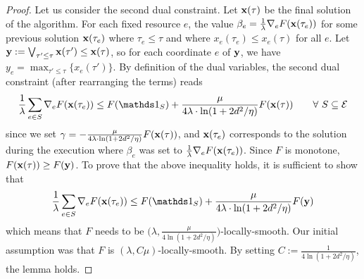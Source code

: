 \begin{proof}
Let us consider the second dual constraint. Let $\mathbf{x}(\tau)$ be the final solution of the algorithm. For each fixed resource $e$, the value $\beta_{e} = \frac{1}{\lambda} \nabla_{e} F(\mathbf{x}(\tau_e))$ for some previous solution $\mathbf{x}(\tau_e)$ where $\tau_e \le \tau$ and where $x_{e}(\tau_e) \leq x_{e}(\tau)$ for all $e$.
Let $\mathbf{y} := \bigvee_{\tau' \le \tau} \mathbf{x}(\tau') \leq \mathbf{x}(\tau)$, so for each coordinate $e$ of $\mathbf{y}$, we have $y_{e} = \max_{\tau' \le \tau}\{x_{e}(\tau')\}$.
By definition of the dual variables, the second dual constraint (after rearranging the terms) reads
\begin{align*}
	\frac{1}{\lambda} \sum_{e \in S} \nabla_{e} F(\vect{x}(\tau_e)) \leq F(\one_{S}) + \frac{\mu}{4\lambda \cdot \ln(1+2d^{2}/\eta)} F(\vect{x}(\tau)) \quad \quad \forall\ S \subseteq \mathcal{E}
\end{align*}
since we set $\gamma = -\frac{\mu}{4\lambda \cdot \ln(1+2d^{2}/\eta)} F(\mathbf{x}(\tau))$, and $\mathbf{x}(\tau_e)$ corresponds to the solution during the execution where $\beta_e$ was set to $\frac{1}{\lambda} \nabla_{e} F(\mathbf{x}(\tau_e))$.
Since $F$ is monotone, $F(\mathbf{x}(\tau)) \geq F(\mathbf{y})$. To prove that the above inequality holds, it is sufficient to show that
\begin{align*}
	\frac{1}{\lambda} \sum_{e \in S} \nabla_{e} F(\vect{x}(\tau_e)) \leq F(\one_{S}) + \frac{\mu}{4\lambda \cdot \ln(1+2d^{2}/\eta)} F(\vect{y})
\end{align*}
which means that $F$ needs to be  $\bigl(\lambda, \frac{\mu}{4\ln(1+2d^{2}/\eta)}\bigr)$-locally-smooth. Our initial assumption was that $F$ is $(\lambda, C \mu)$-locally-smooth. By setting $C := \frac{1}{4\ln(1+2d^{2}/\eta)}$, the lemma holds.
\end{proof}


